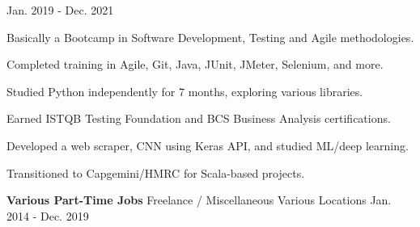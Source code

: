 \begin{cventries}
    {Jan. 2019 - Dec. 2021}
    {
      \begin{sloppypar}  
      \begin{cvitems}
        \item {Basically a Bootcamp in Software Development, Testing and Agile methodologies.}
        \item {Completed training in Agile, Git, Java, JUnit, JMeter, Selenium, and more.}
        \item {Studied Python independently for 7 months, exploring various libraries.}
        \item {Earned ISTQB Testing Foundation and BCS Business Analysis certifications.}
        \item {Developed a web scraper, CNN using Keras API, and studied ML/deep learning.}
        \item {Transitioned to Capgemini/HMRC for Scala-based projects.}
      \end{cvitems}
      \end{sloppypar}
    }    

\cventry
    {\textbf{Various Part-Time Jobs}} 
    {Freelance / Miscellaneous} 
    {Various Locations} 
    {Jan. 2014 - Dec. 2019}
    {}      

\end{cventries}
